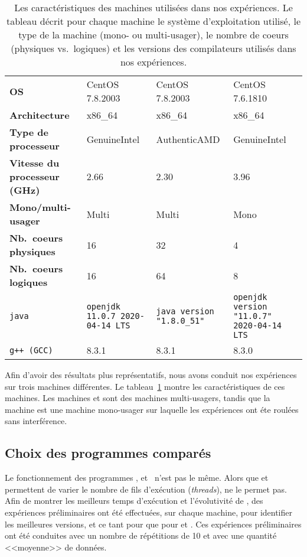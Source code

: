 \newcommand{\LARGEUR}{3cm}

\begin{table}
\begin{tabular}{|p{3cm}|p{\LARGEUR}|p{\LARGEUR}|p{\LARGEUR}|}
\hline
  & \M1 & \M2 & \M3
\\\hline
\textbf{OS} & CentOS 7.8.2003 & CentOS 7.8.2003 & CentOS 7.6.1810
\\\hline
\textbf{Architecture} &  x86\_64 & x86\_64 & x86\_64
\\\hline
\textbf{Type de processeur} & GenuineIntel  & AuthenticAMD & GenuineIntel
\\\hline
\textbf{Vitesse du processeur (GHz)} & 2.66 & 2.30 & 3.96
\\\hline
\textbf{Mono/multi-usager} & Multi & Multi & Mono
\\\hline
\textbf{Nb.~coeurs physiques} & 16 & 32 & 4
\\\hline
\textbf{Nb.~coeurs logiques} & 16 & 64 & 8
\\\hline
\texttt{java}
  & \texttt{openjdk 11.0.7 2020-04-14 LTS}
  & \texttt{java version "1.8.0\_51"}
  & \texttt{openjdk version "11.0.7" 2020-04-14 LTS}
\\\hline
\texttt{g++ (GCC)}
   & 8.3.1
   & 8.3.1 
   & 8.3.0
\\\hline
\end{tabular}
\caption[Les caract\'eristiques des machines utilis\'ees dans nos exp\'eriences.]{Les caract\'eristiques des machines utilis\'ees dans nos exp\'eriences. Le tableau d\'ecrit pour chaque machine le syst\`eme d'exploitation utilis\'e, le type de la machine (mono- ou multi-usager), le nombre de coeurs (physiques vs.\ logiques) et les versions des compilateurs utilis\'es dans nos exp\'eriences.}
\label{machines.table}
\end{table}


Afin d'avoir des r\'esultats plus représentatifs, nous avons conduit nos exp\'eriences sur trois machines diff\'erentes. Le tableau~\ref{machines.table} montre les caract\'eristiques de ces machines. Les machines  et  sont des machines multi-usagers, tandis que la machine  est une machine mono-usager sur laquelle les exp\'eriences ont \'et\/e roul\'ees sans interf\'erence.

\subsection{Choix des programmes comparés}

Le fonctionnement des programmes ,  et~ n'est pas le m\^eme. Alors que  et  permettent de varier le nombre de fils d'ex\'ecution (\emph{threads}),  ne le permet pas. Afin de montrer les meilleurs temps d'ex\'ecution et l'\'evolutivit\'e de , des exp\'eriences pr\'eliminaires ont \'et\'e effectu\'ees, sur chaque machine, pour identifier les meilleures versions, et ce tant pour  que pour  et .
Ces exp\'eriences pr\'eliminaires ont \'et\'e conduites avec un nombre de r\'ep\'etitions de 10 et avec une quantit\'e <<moyenne>> de donn\'ees. 


